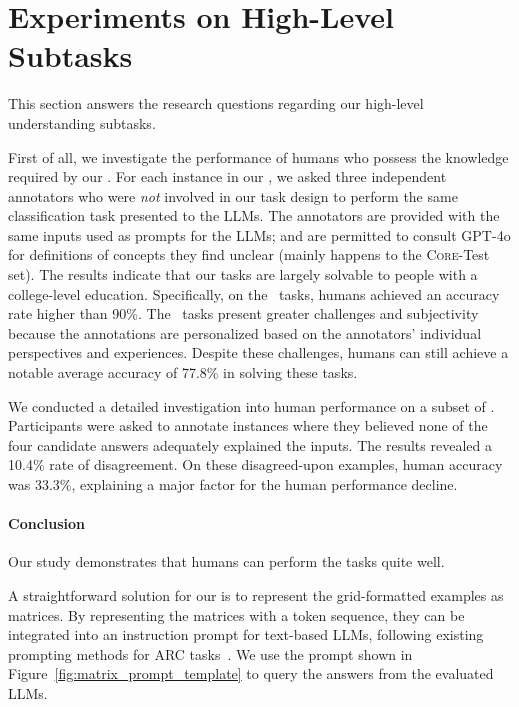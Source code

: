 
\section{Experiments on High-Level Subtasks}
This section answers the research questions regarding our high-level understanding subtasks.


\label{rq:human_perf}

First of all, we investigate the performance of humans who possess the knowledge required by our \datasetnamens.
For each instance in our \datasetnamens, we asked three independent annotators who were \emph{not} involved in our task design to perform the same classification task presented to the LLMs.
The annotators are provided with the same inputs used as prompts for the LLMs; and are permitted to consult GPT-4o for definitions of concepts they find unclear (mainly happens to the \textsc{Core}-Test set).
The results indicate that our tasks are largely solvable to people with a college-level education.
Specifically, on the \coredatasetns\ tasks, humans achieved an accuracy rate higher than 90\%.
The \harddatasetns\ tasks present greater challenges and subjectivity because the annotations are personalized based on the annotators' individual perspectives and experiences. Despite these challenges, humans can still achieve a notable average accuracy of 77.8\% in solving these tasks.

We conducted a detailed investigation into human performance on a subset of \harddatasetns. Participants were asked to annotate instances where they believed none of the four candidate answers adequately explained the inputs. The results revealed a 10.4\% rate of disagreement. On these disagreed-upon examples, human accuracy was 33.3\%, explaining a major factor for the human performance decline.

\paragraph{Conclusion} Our study demonstrates that {humans can perform the \datasetname tasks quite well}.


\label{rq:matrix_input}

A straightforward solution for our \datasetname is to represent the grid-formatted examples as matrices. By representing the matrices with a token sequence, they can be integrated into an instruction prompt for text-based LLMs, following existing prompting methods for ARC tasks~\cite{acquaviva2022communicating,xu2023llms,wang2023hypothesis,wang2024speak}.
We use the prompt shown in Figure~\ref{fig:matrix_prompt_template} to query the answers from the evaluated LLMs.




